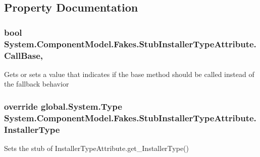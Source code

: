 \subsection{Property Documentation}
\hypertarget{class_system_1_1_component_model_1_1_fakes_1_1_stub_installer_type_attribute_acf821e5a73d1ffab6cd1e8f9064829c8}{
\subsubsection[{Call\-Base}]{\setlength{\rightskip}{0pt plus 5cm}bool System.\-Component\-Model.\-Fakes.\-Stub\-Installer\-Type\-Attribute.\-Call\-Base\hspace{0.3cm}{\ttfamily [get]}, {\ttfamily [set]}}}\label{class_system_1_1_component_model_1_1_fakes_1_1_stub_installer_type_attribute_acf821e5a73d1ffab6cd1e8f9064829c8}


Gets or sets a value that indicates if the base method should be called instead of the fallback behavior

\hypertarget{class_system_1_1_component_model_1_1_fakes_1_1_stub_installer_type_attribute_a35931a3f78949e66714818c07d5d15b7}{
\subsubsection[{Installer\-Type}]{\setlength{\rightskip}{0pt plus 5cm}override global.\-System.\-Type System.\-Component\-Model.\-Fakes.\-Stub\-Installer\-Type\-Attribute.\-Installer\-Type\hspace{0.3cm}{\ttfamily [get]}}}\label{class_system_1_1_component_model_1_1_fakes_1_1_stub_installer_type_attribute_a35931a3f78949e66714818c07d5d15b7}


Sets the stub of Installer\-Type\-Attribute.\-get\-\_\-\-Installer\-Type()

